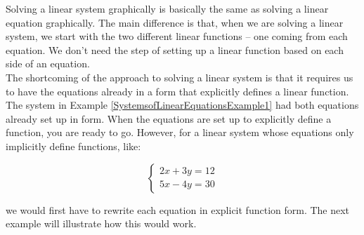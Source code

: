 \bigskip

Solving a linear system graphically is basically the same as solving a linear equation graphically.  The main difference is that, when we are solving a linear system, we start with the two different linear functions – one coming from each equation. We don’t need the step of setting up a linear function based on each side of an equation.\\

The shortcoming of the approach to solving a linear system is that it requires us to have the equations already in a form that explicitly defines a linear function. The system in Example \ref{SystemsofLinearEquationsExample1} had both equations already set up in  form.  When the equations are set up to explicitly define a function, you are ready to go. However, for a linear system whose equations only implicitly define functions, like:

$$\begin{cases}2x+3y=12\\5x-4y=30\end{cases}$$

we would first have to rewrite each equation in explicit function form. The next example will illustrate how this would work.


